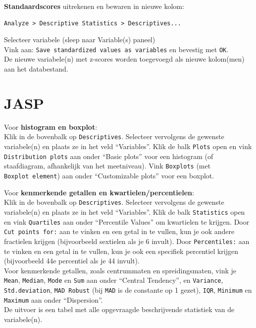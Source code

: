 \documentclass[
]{book}
\begin{document}
\textbf{Standaardscores} uitrekenen en bewaren in nieuwe kolom:\\

\begin{verbatim}
Analyze > Descriptive Statistics > Descriptives...
\end{verbatim}

Selecteer variabele (sleep naar Variable(s) paneel)\\
Vink aan: \texttt{Save\ standardized\ values\ as\ variables} en bevestig met \texttt{OK}.\\
De nieuwe variabele(n) met z-scores worden toegevoegd als nieuwe
kolom(men) aan het databestand.\\

\hypertarget{jasp-3}{%
\section{JASP}\label{jasp-3}}

Voor \textbf{histogram en boxplot}:\\
Klik in de bovenbalk op \texttt{Descriptives}. Selecteer vervolgens de gewenste variabele(n) en plaats ze in het veld ``Variables''. Klik de balk \texttt{Plots} open en vink \texttt{Distribution\ plots} aan onder ``Basic plots'' voor een histogram (of staafdiagram, afhankelijk van het meetniveau). Vink \texttt{Boxplots} (met \texttt{Boxplot\ element}) aan onder ``Customizable plots'' voor een boxplot.

Voor \textbf{kenmerkende getallen en kwartielen/percentielen}:\\
Klik in de bovenbalk op \texttt{Descriptives}. Selecteer vervolgens de gewenste variabele(n) en plaats ze in het veld ``Variables''. Klik de balk \texttt{Statistics} open en vink \texttt{Quartiles} aan onder ``Percentile Values'' om kwartielen te krijgen. Door \texttt{Cut\ points\ for:} aan te vinken en een getal in te vullen, kun je ook andere fractielen krijgen (bijvoorbeeld sextielen als je 6 invult). Door \texttt{Percentiles:} aan te vinken en een getal in te vullen, kun je ook een specifiek percentiel krijgen (bijvoorbeeld 44e percentiel als je 44 invult).\\
Voor kenmerkende getallen, zoals centrummaten en spreidingsmaten, vink je \texttt{Mean}, \texttt{Median}, \texttt{Mode} en \texttt{Sum} aan onder ``Central Tendency'', en \texttt{Variance}, \texttt{Std.deviation}, \texttt{MAD\ Robust} (bij \texttt{MAD} is de constante op 1 gezet), \texttt{IQR}, \texttt{Minimum} en \texttt{Maximum} aan onder ``Dispersion''.\\
De uitvoer is een tabel met alle opgevraagde beschrijvende statistiek van de variabele(n).
\end{document}
